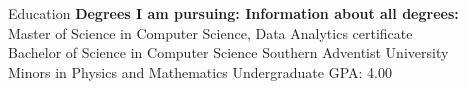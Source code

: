 \begin{rSection}{Education}
  {\bf\small Degrees I am pursuing: \hfill \bf Information about all degrees:}\\
  Master of Science in Computer Science, Data Analytics certificate \hfill {}\\
  Bachelor of Science in Computer Science \hfill {Southern Adventist University}\\
  Minors in Physics and Mathematics \hfill {Undergraduate GPA: 4.00}
\end{rSection}